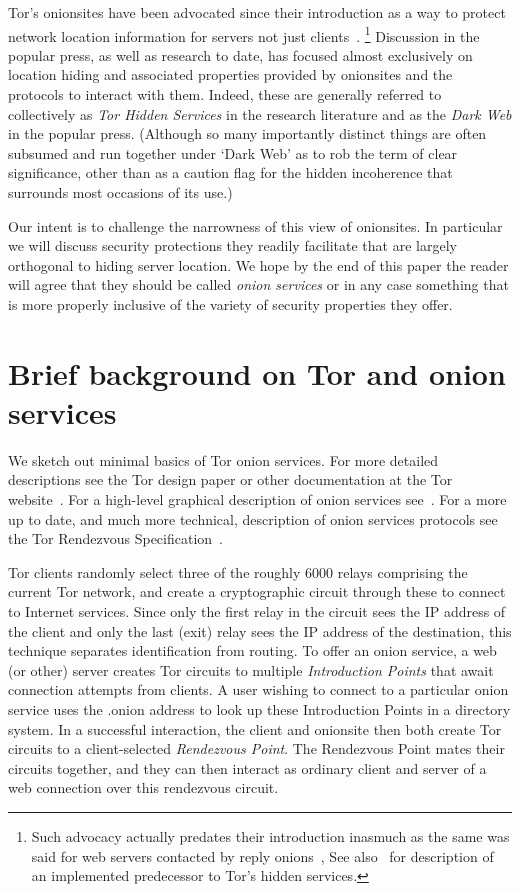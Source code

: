 \documentclass[10pt, conference, compsocconf]{styles/IEEEtran}
\begin{document}
Tor's onionsites have been advocated since their introduction as a
way to protect network location information for servers not just
clients~\cite{tor-design}. \footnote{Such advocacy actually predates
  their introduction inasmuch as the same was said for web servers
  contacted by reply onions~\cite{onion-routing:cacm99}, See
  also~\cite{rewebber} for description of an implemented predecessor
  to Tor's hidden services.}  Discussion in the popular press, as well
as research to date, has focused almost exclusively on location hiding
and associated properties provided by onionsites and the protocols
to interact with them. Indeed, these are generally referred to
collectively as \emph{Tor Hidden Services} in the research literature
and as the \emph{Dark Web} in the popular press. (Although so many
importantly distinct things are often subsumed and run together under
`Dark Web' as to rob the term of clear significance, other than as a
caution flag for the hidden incoherence that surrounds
most occasions of its use.)

Our intent is to challenge the narrowness of this view of
onionsites. In particular we will discuss security protections they
readily facilitate that are largely orthogonal to hiding server
location. We hope by the end of this paper the reader will agree that
they should be called \emph{onion services} or in any
case something that is more properly inclusive of the variety of
security properties they offer.

\section{Brief background on Tor and onion services}

We sketch out minimal basics of Tor onion services. For more detailed
descriptions see the Tor design paper or other documentation at the
Tor website~\cite{torproject}. For a high-level graphical description
of onion services see~\cite{tor-hs}. For a more up to date, and much
more technical, description of onion services protocols see the Tor
Rendezvous Specification~\cite{tor-rend-spec}.

Tor clients randomly select three of the roughly 6000 relays
comprising the current Tor network, and create a cryptographic circuit
through these to connect to Internet services. Since only the first
relay in the circuit sees the IP address of the client and
only the last (exit) relay sees the IP address of the destination,
this technique separates identification from routing.
To offer an onion service, a web (or other) server creates Tor circuits to
multiple \emph{Introduction Points} that await connection attempts
from clients. A user wishing to connect to a particular onion service
uses the .onion address to look up these Introduction Points in a
directory system. In a successful interaction, the client and
onionsite then both create Tor circuits to a client-selected
\emph{Rendezvous Point}. The Rendezvous Point mates their circuits
together, and they can then interact as ordinary client and server of
a web connection over this rendezvous circuit.
\end{document}
